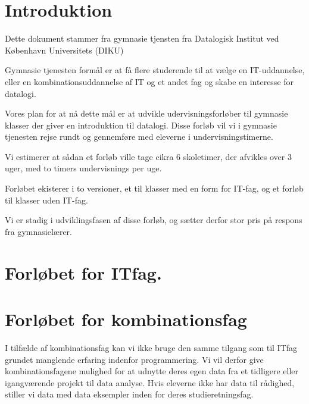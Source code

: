 \documentclass[11pt]{article}
\begin{document}
    \newpage                %
    \setcounter{page}{1}    %

\section{Introduktion}
    Dette dokument stammer fra gymnasie tjensten fra
    Datalogisk Institut ved København Universitets (DIKU)

    Gymnasie tjenesten formål er at få flere studerende til at vælge en IT-uddannelse,
    eller en kombinationsuddannelse af IT og et andet fag og
    skabe en interesse for datalogi.

    Vores plan for at nå dette mål er at udvikle udervisningsforløber til gymnasie klasser
    der giver en introduktion til datalogi. Disse forløb vil vi i gymnasie tjenesten rejse
    rundt og gennemføre med eleverne i undervisningstimerne.

    Vi estimerer at sådan et forløb ville tage cikra 6 skoletimer, der afvikles over 3 uger,
    med to timers undervisnings per uge.

    Forløbet ekisterer i to versioner, et til klasser med en form for IT-fag,
    og et forløb til klasser uden IT-fag.

    Vi er stadig i udviklingsfasen af disse forløb, og sætter derfor stor pris på respons
    fra gymnasielærer.

\section{Forløbet for ITfag. }


\section{Forløbet for kombinationsfag}
    I tilfælde af kombinationsfag kan vi ikke bruge den samme tilgang som
    til ITfag grundet manglende erfaring indenfor programmering. Vi vil derfor
    give kombinationsfagene mulighed for at udnytte deres egen data fra et tidligere
    eller igangværende projekt til data analyse.
    Hvis eleverne ikke har data til rådighed, stiller vi data med data eksempler inden
    for deres studieretningsfag.
\end{document}
